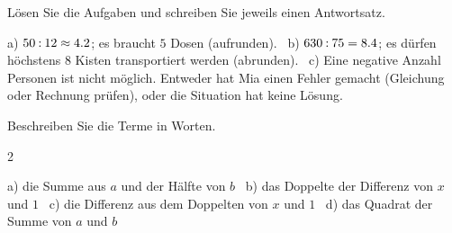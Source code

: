 \documentclass[11pt]{exam}
\begin{document}
\begin{questions}

\question Lösen Sie die Aufgaben und schreiben Sie jeweils einen Antwortsatz.
\begin{solution}
  a) $50 \mathbin{:} 12 \approx 4.2$; es braucht $5$ Dosen (aufrunden). \
  b) $630 \mathbin{:} 75 = 8.4$; es dürfen höchstens $8$ Kisten transportiert
  werden (abrunden). \
  c) Eine negative Anzahl Personen ist nicht möglich. Entweder hat Mia einen
  Fehler gemacht (Gleichung oder Rechnung prüfen), oder die Situation hat keine
  Lösung.
\end{solution}
\raum{4cm}

\question Beschreiben Sie die Terme in Worten.
\begin{multicols}{2}
\begin{parts}
  \part $a + \dfrac{b}{2}$
  \part $2 \cdot (x - 1)$
  \part $2x - 1$
  \part $(a + b)^2$
\end{parts}
\end{multicols}
\begin{solution}
  a) die Summe aus $a$ und der Hälfte von $b$ \
  b) das Doppelte der Differenz von $x$ und $1$ \
  c) die Differenz aus dem Doppelten von $x$ und $1$ \
  d) das Quadrat der Summe von $a$ und $b$
\end{solution}
\raum{3cm}


\end{questions}
\end{document}

